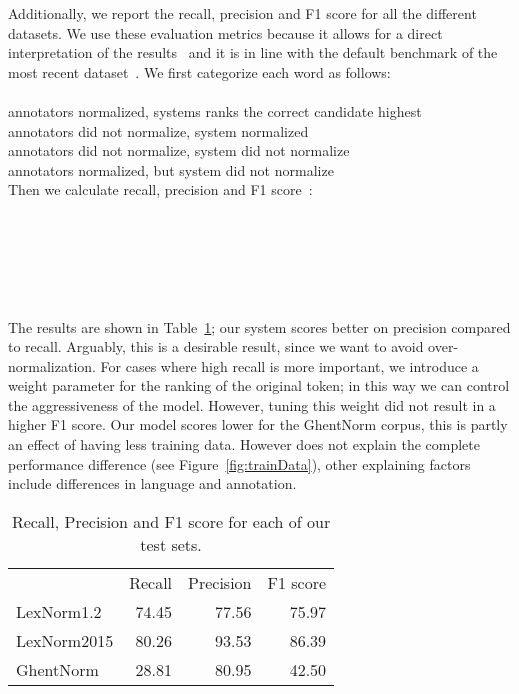 \documentclass[a4paper,10pt,twoside]{article}
\begin{document}
Additionally, we report the recall, precision and F1 score for all the
different datasets. We use these evaluation metrics because it allows for a
direct interpretation of the results~\cite{REYNAERT08.477} and it is in line
with the default benchmark of the most recent
dataset~\cite{baldwin-EtAl:2015:WNUT}. We first categorize each word as
follows:
\\
\\
\noindent annotators normalized, systems ranks the correct candidate highest \\
\noindent annotators did not normalize, system normalized \\
\noindent annotators did not normalize, system did not normalize \\
\noindent annotators normalized, but system did not normalize \\


Then we calculate recall, precision and F1 score~\cite{rijsbergen1979v}: 
\\
\\
 \\ \\ \\ \\
\\

The results are shown in Table~\ref{tab:finalTest}; our system scores better on
precision compared to recall.  Arguably, this is a desirable result, since we
want to avoid over-normalization. For cases where high recall is more
important, we introduce a weight parameter for the ranking of the original
token; in this way we can control the aggressiveness of the model. However,
tuning this weight did not result in a higher F1 score. Our model scores lower
for the GhentNorm corpus, this is partly an effect of having less training data.
However does not explain the complete performance difference (see
Figure~\ref{fig:trainData}), other explaining factors include differences in
language and annotation.

\begin{table}
    \centering
    \begin{tabular}{l r r r}
                    & Recall & Precision & F1 score \\
        LexNorm1.2  & 74.45  & 77.56     & 75.97 \\
        LexNorm2015 & 80.26  & 93.53     & 86.39 \\
        GhentNorm   & 28.81  & 80.95     & 42.50 \\
    \end{tabular}
    \caption{Recall, Precision and F1 score for each of our test sets.}
    \label{tab:finalTest}
\end{table}
\end{document}
